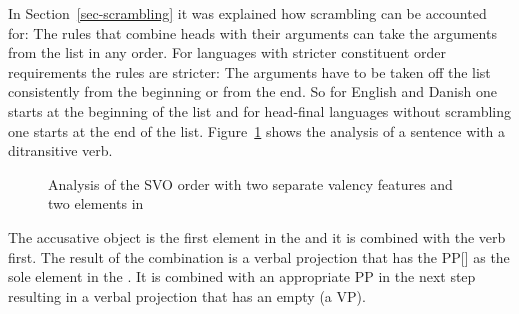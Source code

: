 In Section~\ref{sec-scrambling} it was explained how scrambling can be accounted for: The rules that
combine heads with their arguments can take the arguments from the list in any order. For languages
with stricter constituent order requirements the rules are stricter: The arguments have to be taken
off the list consistently from the beginning or from the end. So for English and Danish one starts
at the beginning of the list and for head-final languages without scrambling one starts at the end
of the list. Figure~\ref{fig-svo-ditrans} shows the analysis of a sentence with a ditransitive verb.
\begin{figure}
\caption{\label{fig-svo-ditrans}Analysis of the SVO order with two separate valency features and two
  elements in \comps}
\end{figure}
The accusative object is the first element in the \compsl and it is combined with the verb
first. The result of the combination is a verbal projection that has the PP[] as the sole
element in the \compsl. It is combined with an appropriate PP in the next step resulting in a verbal
projection that has an empty \compsl (a VP).


